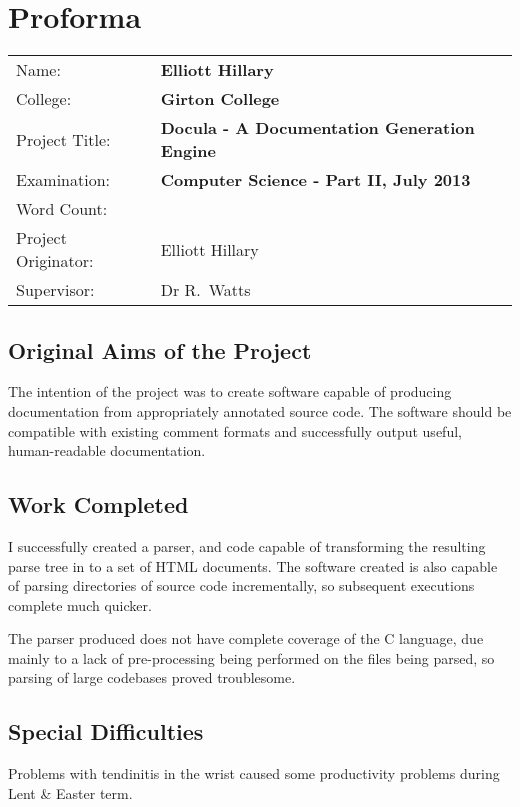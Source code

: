\chapter*{Proforma}

{\large
  \begin{tabular}{l l}
    Name:               & \bf Elliott Hillary                            \\
    College:            & \bf Girton College                             \\
    Project Title:      & \bf Docula - A Documentation Generation Engine \\
    Examination:        & \bf Computer Science - Part II, July 2013      \\
    Word Count:         & \bf                  \\
    Project Originator: & Elliott Hillary                                \\
    Supervisor:         & Dr R.~Watts                                    \\
  \end{tabular}
}

\section*{Original Aims of the Project}
The intention of the project was to create software capable of producing
documentation from appropriately annotated source code. The software should be
compatible with existing comment formats and successfully output useful,
human-readable documentation.


\section*{Work Completed}
I successfully created a parser, and code capable of transforming the
resulting parse tree in to a set of HTML documents. The software created is also
capable of parsing directories of source code incrementally, so subsequent
executions complete much quicker.

The parser produced does not have complete coverage of the C language, due
mainly to a lack of pre-processing being performed on the files being parsed, so
parsing of large codebases proved troublesome.


\section*{Special Difficulties}
Problems with tendinitis in the wrist caused some productivity problems
during Lent \& Easter term.

